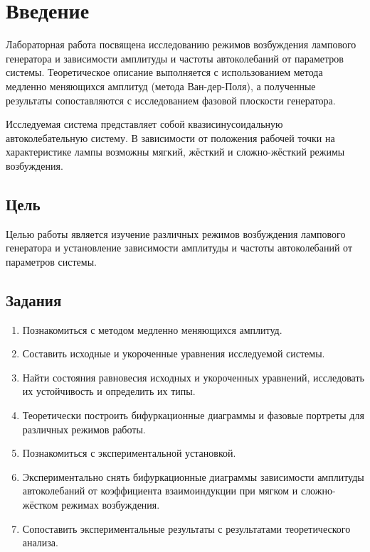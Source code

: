 \section{Введение}

Лабораторная работа посвящена исследованию режимов возбуждения лампового генератора и зависимости амплитуды и частоты автоколебаний от параметров системы. Теоретическое описание выполняется с использованием метода медленно меняющихся амплитуд (метода Ван-дер-Поля), а полученные результаты сопоставляются с исследованием фазовой плоскости генератора.

Исследуемая система представляет собой квазисинусоидальную автоколебательную систему. В зависимости от положения рабочей точки на характеристике лампы возможны мягкий, жёсткий и сложно-жёсткий режимы возбуждения.

\subsection*{Цель} 

Целью работы является изучение различных режимов возбуждения лампового генератора и установление зависимости амплитуды и частоты автоколебаний от параметров системы.

\subsection*{Задания} 

\begin{enumerate}
	\item Познакомиться с методом медленно меняющихся амплитуд.
	\item Составить исходные и укороченные уравнения исследуемой системы.
	\item Найти состояния равновесия исходных и укороченных уравнений, исследовать их устойчивость и определить их типы.
	\item Теоретически построить бифуркационные диаграммы и фазовые портреты для различных режимов работы.
	\item Познакомиться с экспериментальной установкой.
	\item Экспериментально снять бифуркационные диаграммы зависимости амплитуды автоколебаний от коэффициента взаимоиндукции при мягком и сложно-жёстком режимах возбуждения.
	\item Сопоставить экспериментальные результаты с результатами теоретического анализа.
\end{enumerate}

